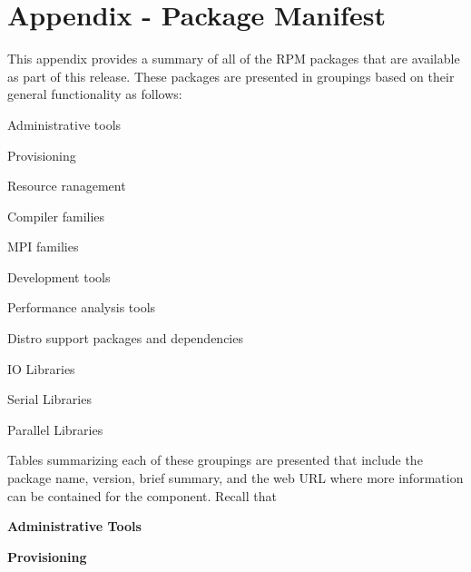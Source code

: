 \clearpage

\appendix
\section*{Appendix - Package Manifest}
\renewcommand{\thesubsection}{\Alph{subsection}}


This appendix provides a summary of all of the RPM packages that are available
as part of this \FSP{} release. These packages are presented in groupings
based on their general functionality as follows:

\begin{itemize*}
\item Administrative tools
\item Provisioning
\item Resource ranagement
\item Compiler families
\item MPI families
\item Development tools
\item Performance analysis tools
\item Distro support packages and dependencies
\item IO Libraries
\item Serial Libraries
\item Parallel Libraries
\end{itemize*}

Tables summarizing each of these groupings are presented that include
the package name, version, brief summary, and the web URL where more information
can be contained for the component. Recall that 



\newcommand{\firstColWidth}{3.5cm}
\newcommand{\secondColWidth}{1.5cm}


\begin{table}[h!]

\caption{\bf Administrative Tools} \vspace*{0.1cm}
\end{table}

\begin{table}[h!]

\caption{\bf Provisioning} \vspace*{0.1cm}
\end{table}

